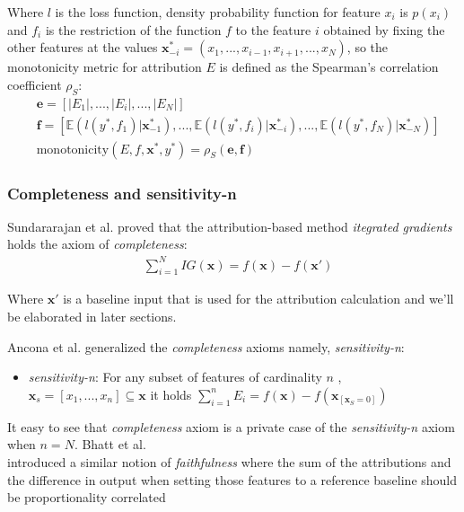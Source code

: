 \documentclass[12pt]{report}
\begin{document}
Where $l$ is the loss function, density probability function for feature $x_i$ is $p(x_i)$ and $f_i$ is the restriction of the function $f$ to the feature $i$ obtained by fixing the other features at the values $\mathbf{x}^{*}_{-i} = (x_1, ..., x_{i-1}, x_{i+1} , ... , x_{N})$, so the monotonicity metric for attribution $E$ is defined as the Spearman’s
correlation coefficient $\rho_{S}$:
\begin{align*}
	&\mathbf{e} = [|E_1|, ..., |E_i|,..., |E_N|] \\
	&\mathbf{f}  =  [\mathbb{E}(l(y^*, f_1)|\mathbf{x}^*_{-1}), ..., \mathbb{E}(l(y^*, f_i)|\mathbf{x}^*_{-i}) ,..., \mathbb{E}(l(y^*, f_N)|\mathbf{x}^*_{-N})] \\
	&\text{monotonicity}(E,f, \mathbf{x}^*,y^*)   = \rho_{S}(\mathbf{e}, \mathbf{f})
\end{align*}


\subsubsection{Completeness and sensitivity-n}
Sundararajan et al. \cite{DBLP:journals/corr/SundararajanTY17} proved that the attribution-based method \textit{itegrated gradients} holds the axiom of \textit{completeness}:
\begin{align*}
	&\sum_{i=1}^N IG(\mathbf{x}) = f(\mathbf{x})-f(\mathbf{x}')
\end{align*}

Where $\mathbf{x}'$ is a baseline input that is used for the attribution calculation and we'll be elaborated in later sections.  

Ancona et al. \cite{https://doi.org/10.48550/arxiv.1711.06104} generalized the \textit{completeness} axioms namely, \textit{sensitivity-n}:
\begin{itemize}
	\item \textit{sensitivity-n}: For any subset of features of cardinality $n$ , $\mathbf{x}_s= [x_1, ...,x_n] \subseteq \mathbf{x} $ it holds $\sum_{i=1}^n E_i = f(\mathbf{x})- f(\mathbf{x}_{[\mathbf{x}_S =0]})$ 
\end{itemize}

It easy to see that \textit{completeness} axiom is a private case of the \textit{sensitivity-n} axiom when $n=N$. Bhatt et al. \\

\cite{DBLP:journals/corr/abs-2005-00631}  introduced a similar notion of \textit{faithfulness} where the sum of the attributions and the difference in output when setting those features to a reference baseline should be proportionality correlated
\end{document}
